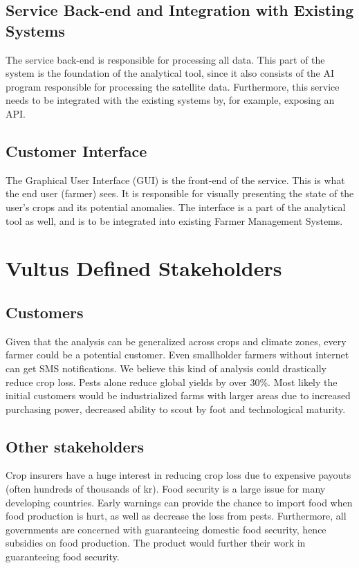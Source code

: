 \documentclass[a4paper]{article}
\begin{document}
\subsection{Service Back-end and Integration with Existing Systems}
The service back-end is responsible for processing all data. This part of the system is the foundation of the analytical tool, since it also consists of the AI program responsible for processing the satellite data. Furthermore, this service needs to be integrated with the existing systems by, for example, exposing an API. 

\subsection{Customer Interface}
The Graphical User Interface (GUI) is the front-end of the service. This is what the end user (farmer) sees. It is responsible for visually presenting the state of the user's crops and its potential anomalies. The interface is a part of the analytical tool as well, and is to be integrated into existing Farmer Management Systems. 


\section{Vultus Defined Stakeholders}
\subsection{Customers}
Given that the analysis can be generalized across crops and climate zones, every farmer could be a potential customer. Even smallholder farmers without internet can get SMS notifications. We believe this kind of analysis could drastically reduce crop loss. Pests alone reduce global yields by over 30\%. Most likely the initial customers would be industrialized farms with larger areas due to increased
purchasing power, decreased ability to scout by foot and technological maturity.

\subsection{Other stakeholders}
Crop insurers have a huge interest in reducing crop loss due to expensive payouts (often hundreds of thousands of kr). Food security is a large issue for many developing countries. Early warnings can provide the chance to import food when food production is hurt, as well as decrease the loss from pests. Furthermore, all governments are concerned with guaranteeing domestic food security, hence subsidies on food production. The product would further their work in guaranteeing food security.
\end{document}
